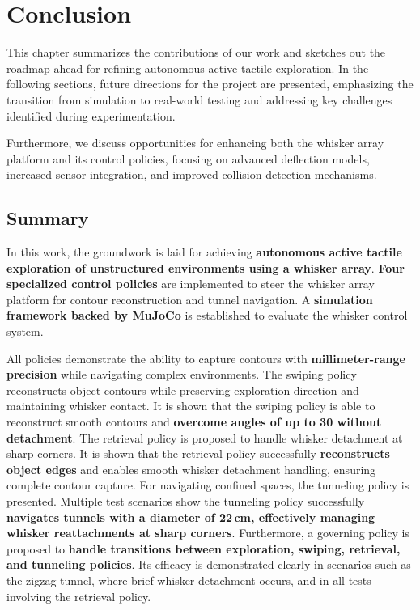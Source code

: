 

\chapter{Conclusion}

This chapter summarizes the contributions of our work and sketches out the roadmap ahead for refining autonomous active tactile exploration.
In the following sections, future directions for the project are presented, emphasizing the transition from simulation to real-world testing and addressing key challenges identified during experimentation.

Furthermore, we discuss opportunities for enhancing both the whisker array platform and its control policies, focusing on advanced deflection models, increased sensor integration, and improved collision detection mechanisms.


\section{Summary}

In this work, the groundwork is laid for achieving \textbf{autonomous active tactile exploration of unstructured environments using a whisker array}.
\textbf{Four specialized control policies} are implemented to steer the whisker array platform for contour reconstruction and tunnel navigation.
A \textbf{simulation framework backed by MuJoCo} is established to evaluate the whisker control system.

All policies demonstrate the ability to capture contours with \textbf{millimeter-range precision} while navigating complex environments.
The swiping policy reconstructs object contours while preserving exploration direction and maintaining whisker contact.
It is shown that the swiping policy is able to reconstruct smooth contours and \textbf{overcome angles of up to 30\degree{} without detachment}.
The retrieval policy is proposed to handle whisker detachment at sharp corners.
It is shown that the retrieval policy successfully \textbf{reconstructs object edges} and enables smooth whisker detachment handling, ensuring complete contour capture.
For navigating confined spaces, the tunneling policy is presented.
Multiple test scenarios show the tunneling policy successfully \textbf{navigates tunnels with a diameter of 22\,cm, effectively managing whisker reattachments at sharp corners}.
Furthermore, a governing policy is proposed to \textbf{handle transitions between exploration, swiping, retrieval, and tunneling policies}.
Its efficacy is demonstrated clearly in scenarios such as the zigzag tunnel, where brief whisker detachment occurs, and in all tests involving the retrieval policy.

